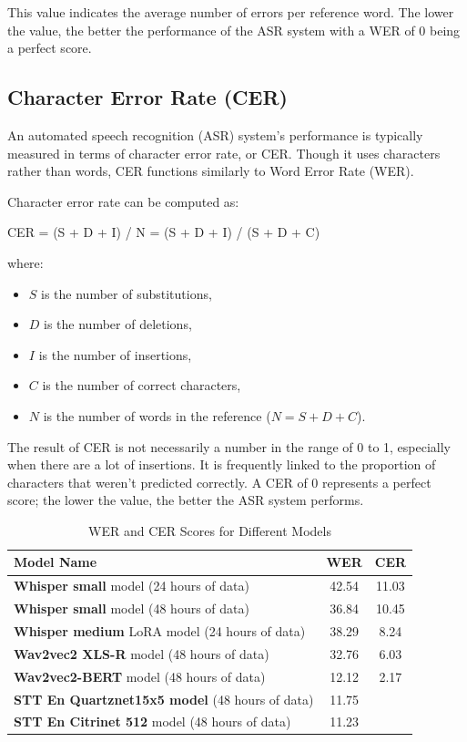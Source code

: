\documentclass[conference]{IEEEtran}
\begin{document}
This value indicates the average number of errors per reference word. The lower the value, the better the performance of the ASR system with a WER of 0 being a perfect score. 

\subsection{Character Error Rate (CER)}

\quad \quad An automated speech recognition (ASR) system's performance is typically measured in terms of character error rate, or CER. Though it uses characters rather than words, CER functions similarly to Word Error Rate (WER).

Character error rate can be computed as:

CER = (S + D + I) / N = (S + D + I) / (S + D + C)

where:
\begin{itemize}
    \item \( S \) is the number of substitutions,
    \item \( D \) is the number of deletions,
    \item \( I \) is the number of insertions,
    \item \( C \) is the number of correct characters,
    \item \( N \) is the number of words in the reference (\( N=S+D+C \)). \cite{morris2004}
\end{itemize}

The result of CER is not necessarily a number in the range of 0 to 1, especially when there are a lot of insertions. It is frequently linked to the proportion of characters that weren't predicted correctly. A CER of 0 represents a perfect score; the lower the value, the better the ASR system performs.

\begin{table}[ht]
    \centering
    \begin{tabular}{lcc}
        \toprule
        \textbf{Model Name} & \textbf{WER} &  \textbf{CER} \\
        \midrule
        \textbf{Whisper small} model (24 hours of data) & 42.54 & 11.03 \\
        \textbf{Whisper small} model (48 hours of data) & 36.84 & 10.45 \\
        \textbf{Whisper medium} LoRA model (24 hours of data) & 38.29&  8.24\\
        \textbf{Wav2vec2 XLS-R} model (48 hours of data) & 32.76 & 6.03\\
        \textbf{Wav2vec2-BERT} model (48 hours of data) & 12.12 & 2.17\\
        \textbf{STT En Quartznet15x5 model} (48 hours of data) & 11.75 & \\
        \textbf{STT En Citrinet 512} model (48 hours of data) & 11.23 & \\
        
        \bottomrule
    \end{tabular}
    \caption{WER and CER Scores for Different Models}
    \label{tab:wer_cer_scores}
\end{table}
\end{document}
